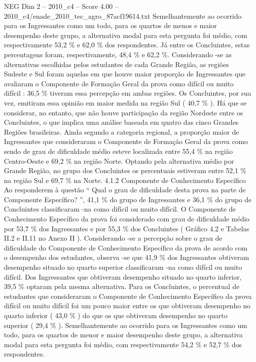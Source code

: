 \begin{textsample}{NEG Dim 2 – 2010\_c4 – Score 4.00 – 2010\_c4/enade\_2010\_tec\_agro\_87acf19614.txt}
Semelhantemente ao ocorrido para os Ingressantes como um todo, para os quartos de menos e maior desempenho deste grupo, a alternativa modal para esta pergunta foi médio, com respectivamente 53,2 \% e 62,0 \% dos respondentes.
Já entre os Concluintes, estas percentagens foram, respectivamente, 48,4 \% e 62,2 \%.
Considerando -se as alternativas escolhidas pelos estudantes de cada Grande Região, as regiões Sudeste e Sul foram aquelas em que houve maior proporção de Ingressantes que avaliaram o Componente de Formação Geral da prova como difícil ou muito difícil : 36,5 \% tiveram essa percepção em ambas regiões.
Os Concluintes, por sua vez, emitiram essa opinião em maior medida na região Sul ( 40,7 \% ).
Há que se considerar, no entanto, que não houve participação da região Nordeste entre os Concluintes, o que implica uma análise baseada em quatro das cinco Grandes Regiões brasileiras.
Ainda segundo a categoria regional, a proporção maior de Ingressantes que consideraram o Componente de Formação Geral da prova como sendo de grau de dificuldade médio esteve localizada entre 55,4 \% na região Centro-Oeste e 69,2 \% na região Norte.
Optando pela alternativa médio por Grande Região, no grupo dos Concluintes os percentuais estiveram entre 52,1 \% na região Sul e 69,7 \% na Norte. 4.1.2 Componente de Conhecimento Específico Ao responderem à questão “ Qual o grau de dificuldade desta prova na parte de Componente Específico? ”, 41,1 \% do grupo de Ingressantes e 36,1 \% do grupo de Concluintes classificaram -na como difícil ou muito difícil.
O Componente de Conhecimento Específico da prova foi considerado com grau de dificuldade médio por 53,7 \% dos Ingressantes e por 55,3 \% dos Concluintes ( Gráfico 4.2 e Tabelas II.2 e II.11 no Anexo II ).
Considerando -se a percepção sobre o grau de dificuldade do Componente de Conhecimento Específico da prova de acordo com o desempenho dos estudantes, observa -se que 41,9 \% dos Ingressantes obtiveram desempenho situado no quarto superior classificaram -na como difícil ou muito difícil.
Dos Ingressantes que obtiveram desempenho situado no quarto inferior, 39,5 \% optaram pela mesma alternativa.
Para os Concluintes, o percentual de estudantes que consideraram o Componente de Conhecimento Específico da prova difícil ou muito difícil foi um pouco maior entre os que obtiveram desempenho no quarto inferior ( 43,0 \% ) do que os que obtiveram desempenho no quarto superior ( 29,4 \% ).
Semelhantemente ao ocorrido para os Ingressantes como um todo, para os quartos de menor e maior desempenho deste grupo, a alternativa modal para esta pergunta foi médio, com respectivamente 54,2 \% e 52,7 \% dos respondentes.

\end{textsample}
